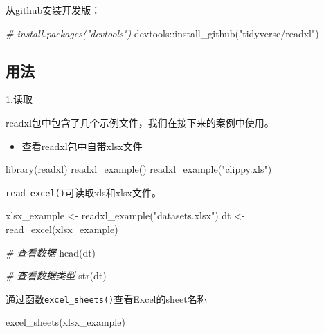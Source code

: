 \documentclass[
]{book}
\newenvironment{Shaded}{\begin{snugshade}}{\end{snugshade}}
\newcommand{\CommentTok}[1]{\textcolor[rgb]{0.56,0.35,0.01}{\textit{#1}}}
\newcommand{\FunctionTok}[1]{\textcolor[rgb]{0.00,0.00,0.00}{#1}}
\newcommand{\NormalTok}[1]{#1}
\newcommand{\OtherTok}[1]{\textcolor[rgb]{0.56,0.35,0.01}{#1}}
\newcommand{\SpecialCharTok}[1]{\textcolor[rgb]{0.00,0.00,0.00}{#1}}
\newcommand{\StringTok}[1]{\textcolor[rgb]{0.31,0.60,0.02}{#1}}
\providecommand{\tightlist}{%
  \setlength{\itemsep}{0pt}\setlength{\parskip}{0pt}}
\begin{document}
从github安装开发版：

\begin{Shaded}
\begin{Highlighting}[]
\CommentTok{\# install.packages("devtools")}
\NormalTok{devtools}\SpecialCharTok{::}\FunctionTok{install\_github}\NormalTok{(}\StringTok{"tidyverse/readxl"}\NormalTok{)}
\end{Highlighting}
\end{Shaded}

\hypertarget{ux7528ux6cd5}{%
\subsection{用法}\label{ux7528ux6cd5}}

1.读取

readxl包中包含了几个示例文件，我们在接下来的案例中使用。

\begin{itemize}
\tightlist
\item
  查看readxl包中自带xlsx文件
\end{itemize}

\begin{Shaded}
\begin{Highlighting}[]
\FunctionTok{library}\NormalTok{(readxl)}
\FunctionTok{readxl\_example}\NormalTok{()}
\FunctionTok{readxl\_example}\NormalTok{(}\StringTok{"clippy.xls"}\NormalTok{)}
\end{Highlighting}
\end{Shaded}

\texttt{read\_excel()}可读取xls和xlsx文件。

\begin{Shaded}
\begin{Highlighting}[]
\NormalTok{xlsx\_example }\OtherTok{\textless{}{-}} \FunctionTok{readxl\_example}\NormalTok{(}\StringTok{"datasets.xlsx"}\NormalTok{)}
\NormalTok{dt }\OtherTok{\textless{}{-}} \FunctionTok{read\_excel}\NormalTok{(xlsx\_example)}

\CommentTok{\# 查看数据}
\FunctionTok{head}\NormalTok{(dt)}

\CommentTok{\# 查看数据类型}
\FunctionTok{str}\NormalTok{(dt)}
\end{Highlighting}
\end{Shaded}

通过函数\texttt{excel\_sheets()}查看Excel的sheet名称

\begin{Shaded}
\begin{Highlighting}[]
\FunctionTok{excel\_sheets}\NormalTok{(xlsx\_example)}
\end{Highlighting}
\end{Shaded}
\end{document}
